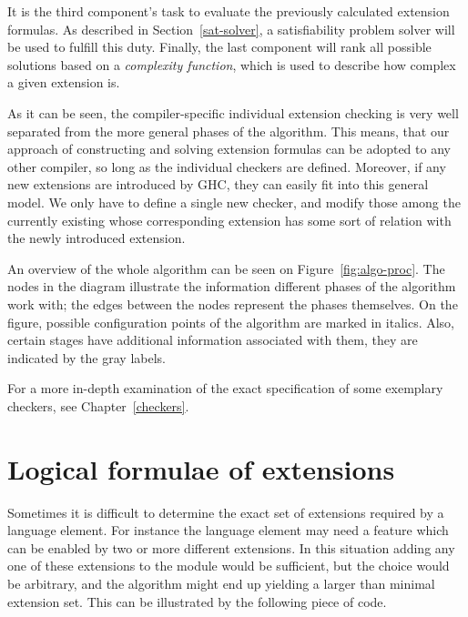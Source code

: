 \documentclass[main.tex]{subfiles}
\begin{document}
	It is the third component's task to evaluate the previously calculated extension formulas. As described in Section~\ref{sat-solver}, a satisfiability problem solver will be used to fulfill this duty. Finally, the last component will rank all possible solutions based on a \emph{complexity function}, which is used to describe how complex a given extension is.
	
	As it can be seen, the compiler-specific individual extension checking is very well separated from the more general phases of the algorithm. This means, that our approach of constructing and solving extension formulas can be adopted to any other compiler, so long as the individual checkers are defined. Moreover, if any new extensions are introduced by GHC, they can easily fit into this general model. We only have to define a single new checker, and modify those among the currently existing whose corresponding extension has some sort of relation with the newly introduced extension.
	
	An overview of the whole algorithm can be seen on Figure~\ref{fig:algo-proc}. The nodes in the diagram illustrate the information different phases of the algorithm work with; the edges between the nodes represent the phases themselves. On the figure, possible configuration points of the algorithm are marked in italics. Also, certain stages have additional information associated with them, they are indicated by the gray labels.
	
	For a more in-depth examination of the exact specification of some exemplary checkers, see Chapter~\ref{checkers}.
	
	
	\begin{figure}[t] 
		\centering
		
	\end{figure}
	

	\section{Logical formulae of extensions} \label{extension-formulas}
	
	Sometimes it is difficult to determine the exact set of extensions required by a language element. For instance the language element may need a feature which can be enabled by two or more different extensions. In this situation adding any one of these extensions to the module would be sufficient, but the choice would be arbitrary, and the algorithm might end up yielding a larger than minimal extension set. This can be illustrated by the following piece of code. 
	
\end{document}
